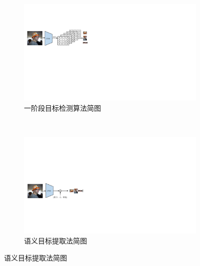 
\begin{figure}[!htbp]
    \centering
    \begin{subfigure}{\textwidth}
    \end{subfigure}%
    \\%
    \begin{subfigure}[b]{\textwidth}
      \centering
      \includegraphics[scale=1.0]{Img/fig_2_yolo.pdf}
      \caption{一阶段目标检测算法简图}
      \label{fig:2_yolo}
    \end{subfigure}
    \\%
    \begin{subfigure}[b]{\textwidth}
      \centering
      \includegraphics[scale=1.0]{Img/fig_2_visual_grounding.pdf}
      \caption{语义目标提取法简图}
      \label{fig:2_visual_grounding}
    \end{subfigure}%
    \label{fig:2_object_detection}
\end{figure}